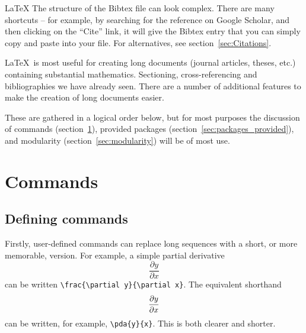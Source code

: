 \begin{chapter}{\LaTeX}
The structure of the Bibtex file can look complex. There are many shortcuts -- for example, by searching for the reference on Google Scholar, and then clicking on the ``Cite'' link, it will give the Bibtex entry that you can simply copy and paste into your file. For alternatives, see section~\ref{sec:Citations}.


\LaTeX\ is most useful for creating long documents (journal articles, theses, etc.) containing substantial mathematics. Sectioning, cross-referencing and bibliographies we have already seen. There are a number of additional features to make the creation of long documents easier.

These are gathered in a logical order below, but for most purposes the discussion of commands (section~\ref{sec:commands}), provided packages (section~\ref{sec:packages_provided}), and modularity (section~\ref{sec:modularity}) will be of most use.

\section{Commands}
\label{sec:commands}

\subsection{Defining commands}
\label{sec:commands_defn}

Firstly, user-defined commands can replace long sequences with a short, or more memorable, version. For example, a simple partial derivative
%
\begin{equation}
  \label{eq:example_pd_1}
  \frac{\partial y}{\partial x}
\end{equation}
%
can be written \verb|\frac{\partial y}{\partial x}|. The equivalent shorthand
%
\begin{equation}
  \label{eq:example_pd_2}
  \frac{\partial {y}}{\partial {x}}
\end{equation}
%
can be written, for example, \verb|\pda{y}{x}|. This is both clearer and shorter.


\end{chapter}
